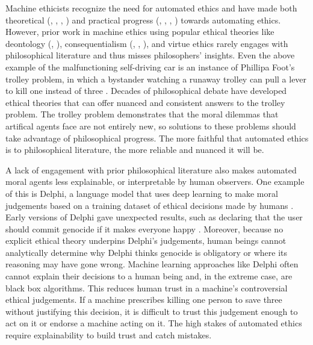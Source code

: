 \begin{isabellebody}
\begin{isamarkuptext}
Machine ethicists recognize the need for automated ethics and have made both theoretical 
(\citep{moralmachineonline}, \citep{davenport}, \citep{moralmachine}, \citep{gabriel}) and practical progress 
(\citep{logicprogramming}, \citep{biology}, \citep{delphi}, \citep{winfield}) towards automating ethics. 
However, prior work in machine ethics using popular ethical theories like deontology (\citep{deon2}, \citep{deon1}), 
consequentialism (\citep{util1}, \citep{util2}, \citep{cloos}), and virtue ethics \citep{berberich} rarely 
engages with philosophical literature and thus misses philosophers' insights. Even the above example of 
the malfunctioning self-driving car is an instance of Phillipa Foot's trolley problem, 
in which a bystander watching a runaway trolley can pull a lever to kill one instead of three \citep{foot}. 
Decades of philosophical debate have developed ethical theories that can offer nuanced and 
consistent answers to the trolley problem. The trolley problem demonstrates that the moral dilemmas 
that artifical agents face are not entirely new, so solutions to these problems should take advantage of philosophical 
progress. The more faithful that automated ethics is to philosophical literature, the more reliable and 
nuanced it will be.

A lack of engagement with prior philosophical literature also makes automated moral agents less 
explainable, or interpretable by human observers. One example of this is Delphi, a language model that uses deep 
learning to make moral judgements based on a training dataset of ethical decisions made by humans \citep{delphi}. 
Early versions of Delphi gave unexpected results, such as declaring that the user should commit 
genocide if it makes everyone happy \citep{verge}. Moreover, because no explicit ethical theory underpins 
Delphi's judgements, human beings cannot analytically determine why Delphi thinks genocide is obligatory
or where its reasoning may have gone wrong. 
Machine learning approaches like Delphi often cannot explain their decisions to a human being and, 
in the extreme case, are black box algorithms. This reduces human trust in a machine's controversial 
ethical judgements. If a machine prescribes killing one person to save three without justifying this 
decision, it is difficult to trust this judgement enough to act on it or endorse a machine acting on it. 
The high stakes of automated ethics require explainability to build trust and catch mistakes. 


\end{isamarkuptext}
\end{isabellebody}
